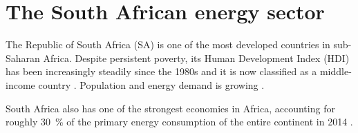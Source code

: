\chapter{The South African energy sector}
The Republic of South Africa (SA) is one of the most developed countries in sub-Saharan Africa. Despite persistent poverty, its Human Development Index (HDI) has been increasingly steadily since the 1980s and it is now classified as a middle-income country \cite{UNDP2014}. Population and energy demand is growing \cite{TheWorldBank2015,Agency2015}.

South Africa also has one of the strongest economies in Africa, accounting for roughly \SI{30}{\percent} of the primary energy consumption of the entire continent in 2014 \cite{BP2015b}.

